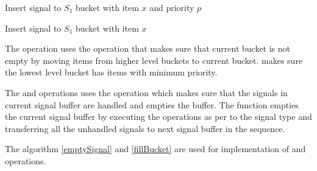 \documentclass[final,3p]{CSP}
\begin{document}
    \begin{algorithm}
        \caption{}\label{updateBucketHeap}
        \begin{algorithmic}[1]
            \State Insert  signal to $S_1$ bucket with item $x$ and priority $p$
            \State {}
        \end{algorithmic}
    \end{algorithm}

    \begin{algorithm}
        \caption{}\label{deleteBucketHeap}
        \begin{algorithmic}[1]
            \State Insert  signal to $S_1$ bucket with item $x$
            \State {}
        \end{algorithmic}
    \end{algorithm}

    The  operation uses the  operation that makes sure that current bucket is not empty by moving items from higher level buckets to current bucket.  makes sure the lowest level bucket has items with minimum priority.

    The  and  operations uses the  operation which makes sure that the signals in current signal buffer are handled and empties the buffer. The function empties the current signal buffer by executing the operations as per to the signal type and transferring all the unhandled signals to next signal buffer in the sequence.

    The algorithm \ref{emptySignal} and \ref{fillBucket} are used for implementation of  and  operations.
\end{document}
